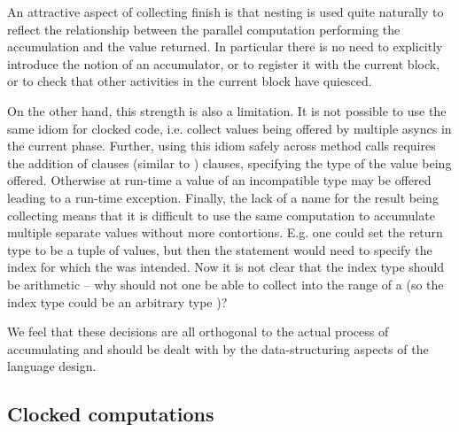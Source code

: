 An attractive aspect of collecting finish is that nesting is used
quite naturally to reflect the relationship between the parallel
computation performing the accumulation and the value returned. In
particular there is no need to explicitly introduce the notion of an
accumulator, or to register it with the current block, or to check
that other activities in the current block have quiesced.

On the other hand, this strength is also a limitation. It is not
possible to use the same idiom for clocked code, i.e.{} collect values
being offered by multiple  asyncs in the current phase.
Further, using this idiom safely across method calls requires the
addition of  clauses (similar to )
clauses, specifying the type of the value being offered. Otherwise at
run-time a value of an incompatible type may be offered leading to a
run-time exception. Finally, the lack of a name for the result being
collecting means that it is difficult to use the same computation to
accumulate multiple separate values without more contortions. E.g.{}
one could set the return type to be a tuple of values, but then the
 statement would need to specify the index for which the
 was intended. Now it is not clear that the index type
should be arithmetic -- why should not one be able to collect into the
range of a  (so the index type could be an arbitrary
type )?

We feel that these decisions are all orthogonal to the actual process
of accumulating and should be dealt with by the data-structuring
aspects of the language design.

\subsection{Clocked computations}

